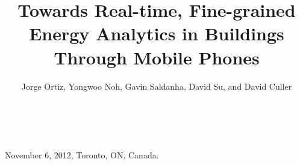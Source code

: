 \documentclass[10pt,print,letterpaper]{sensys-proc}
\begin{document}
 {November 6, 2012, Toronto, ON, Canada.}

\title{Towards Real-time, Fine-grained Energy Analytics in Buildings Through Mobile Phones}
\author{\alignauthor Jorge Ortiz, Yongwoo Noh, Gavin Saldanha, David Su, and David Culler\\
\\
 \\ 
} 



%
%
%
%
%
\end{document}
